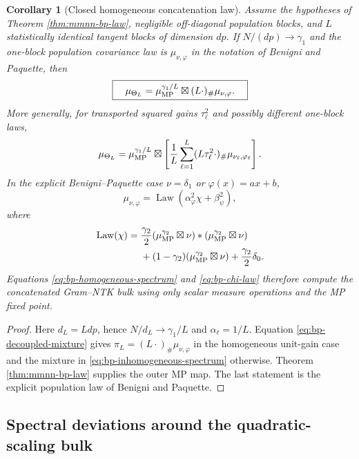 \documentclass{article}
\newtheorem{corollary}[theorem]{Corollary}
\begin{document}
\begin{corollary}[Closed homogeneous concatenation law]
\label{cor:bp-homogeneous-concatenation}
Assume the hypotheses of Theorem \ref{thm:mmnn-bp-law}, negligible
off-diagonal population blocks, and \(L\) statistically identical tangent
blocks of dimension \(d p\).  If
\(N/(dp)\to\gamma_1\) and the one-block population covariance law is
\(\mu_{\nu,\varphi}\) in the notation of Benigni and Paquette, then
\begin{equation}
\boxed{\quad
\mu_{\Theta_L}
=\mu_{\rm MP}^{\gamma_1/L}\boxtimes
(L\cdot)_\#\mu_{\nu,\varphi}.
\quad}
\label{eq:bp-homogeneous-spectrum}
\end{equation}
More generally, for transported squared gains \(\tau_\ell^2\) and possibly
different one-block laws,
\begin{equation}
\mu_{\Theta_L}
=\mu_{\rm MP}^{\gamma_1/L}\boxtimes
\left[\frac1L\sum_{\ell=1}^L
(L\tau_\ell^2\cdot)_\#\mu_{\nu_\ell,\varphi_\ell}\right].
\label{eq:bp-inhomogeneous-spectrum}
\end{equation}
In the explicit Benigni--Paquette case \(\nu=\delta_1\) or
\(\varphi(x)=ax+b\),
\begin{equation}
\mu_{\nu,\varphi}
=\operatorname{Law}(\alpha_\varphi^2\chi+\beta_\psi^2),
\label{eq:bp-explicit-population}
\end{equation}
where
\begin{align}
\operatorname{Law}(\chi)
={}&\frac{\gamma_2}{2}
(\mu_{\rm MP}^{\gamma_2}\boxtimes\nu)
*(\mu_{\rm MP}^{\gamma_2}\boxtimes\nu)
\nonumber\\
&+(1-\gamma_2)(\mu_{\rm MP}^{\gamma_2}\boxtimes\nu)
+\frac{\gamma_2}{2}\delta_0.
\label{eq:bp-chi-law}
\end{align}
Equations \eqref{eq:bp-homogeneous-spectrum} and \eqref{eq:bp-chi-law}
therefore compute the concatenated Gram--NTK bulk using only scalar measure
operations and the MP fixed point.
\end{corollary}

\begin{proof}
Here \(d_L=Ldp\), hence \(N/d_L\to\gamma_1/L\) and
\(\alpha_\ell=1/L\).  Equation \eqref{eq:bp-decoupled-mixture} gives
\(\pi_L=(L\cdot)_\#\mu_{\nu,\varphi}\) in the homogeneous unit-gain case and
the mixture in \eqref{eq:bp-inhomogeneous-spectrum} otherwise.  Theorem
\ref{thm:mmnn-bp-law} supplies the outer MP map.  The last statement is the
explicit population law of Benigni and Paquette.
\end{proof}

\subsection{Spectral deviations around the quadratic-scaling bulk}
\end{document}
